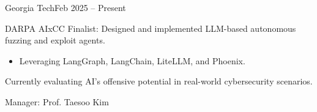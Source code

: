 
\begin{timeitemize}{Georgia Tech}{Feb 2025 -- Present}
    \item DARPA AIxCC Finalist: Designed and implemented LLM-based autonomous fuzzing and exploit agents.
        \begin{itemize}[label=·]
        \item Leveraging LangGraph, LangChain, LiteLLM, and Phoenix.
        \end{itemize}
    \item Currently evaluating AI's offensive potential in real-world cybersecurity scenarios.
    \item Manager: Prof. Taesoo Kim
\end{timeitemize}

